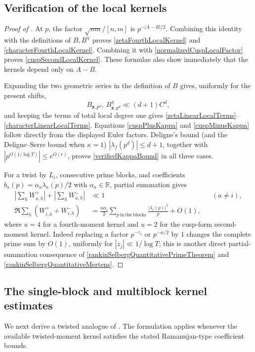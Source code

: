 \documentclass[oneside, 12pt]{amsart}
\theoremstyle{definition}
\begin{document}
	{\subsection{Verification of the local kernels}}
	\begin{proof}[Proof of ]
		{At $p$, the factor $\sqrt{nm}/[n,m]$ is
			$p^{-|A-B|/2}$.  Combining this identity with the definitions of
			$B,B^\chi$ proves \eqref{zetaFourthLocalKernel} and
			\eqref{characterFourthLocalKernel}.  Combining it with
			\eqref{normalizedCuspLocalFactor} proves
			\eqref{cuspSecondLocalKernel}.  These
			formulae also show immediately that the kernels depend only on $A-B$.
			
			Expanding the two geometric series in the definition of $B$ gives,
			uniformly for the present shifts,
			\[
			B_{\mathbf z,p^d},\ B^\chi_{\mathbf z,p^d}
			\ll(d+1)C^d,
			\]
			and keeping the terms of total local degree one gives
			\eqref{zetaLinearLocalTerms}--\eqref{characterLinearLocalTerms}.
			Equations \eqref{cuspPlusKappa} and
			\eqref{cuspMinusKappa} follow directly from the displayed Euler
			factors.  Deligne's bound (and the Deligne--Serre bound when
			$\kappa=1$) $|\lambda_f(p^d)|\leq d+1$, together with
			$|p^{O(1/\log T)}|\leq e^{O(c)}$, proves
			\eqref{verifiedKappaBound} in all three cases.
			
			For a twist by $L_i$, consecutive prime blocks, and coefficients
			$b_a(p)=\alpha_a\lambda_a(p)/2$ with $\alpha_a\in\mathbb R$,
			partial summation gives
			\begin{align}
				\left|\sum_hW_{a,h}^+\right|
				+\left|\sum_hW_{a,h}^-\right|
				&\ll1 &&(a\neq i),\label{verifiedNondistinguishedW}\\
				\Re\sum_h(W_{i,h}^++W_{i,h}^-)
				&=\frac{u\alpha_i}{2}
				\sum_{p\ \mathrm{in\ the\ blocks}}
				\frac{|\lambda_i(p)|^2}{p}+O(1),
				\label{verifiedDistinguishedW}
			\end{align}
			where $u=4$ for a fourth-moment kernel and $u=2$ for the cusp-form
			second-moment kernel.  Indeed replacing a factor $p^{-z_j}$ or
			$p^{-w/2}$ by $1$ changes the complete prime sum by $O(1)$, uniformly
			for $|z_j|\ll1/\log T$; this is another direct partial-summation
			consequence of
			\eqref{rankinSelbergQuantitativePrimeTheorem} and
			\eqref{rankinSelbergQuantitativeMertens}.}
	\end{proof}
	
	{\subsection{The single-block and multiblock kernel estimates}}
	{We next derive a twisted analogue of
		.  The formulation
		applies whenever the available twisted-moment kernel satisfies the
		stated Ramanujan-type coefficient bounds.}
	
\end{document}
